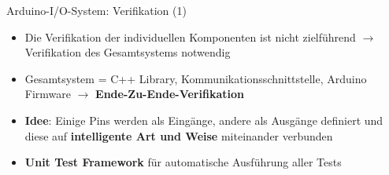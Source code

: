 \documentclass{beamer}
\begin{document}
\begin{frame}{Arduino-I/O-System: Verifikation (1)}
	\begin{itemize}
		\item Die Verifikation der individuellen Komponenten ist nicht zielf\"uhrend $\rightarrow$ Verifikation des Gesamtsystems notwendig
	\end{itemize}
	\begin{itemize}
		\item Gesamtsystem = C++ Library, Kommunikationsschnittstelle, Arduino Firmware $\rightarrow$ \textbf{Ende-Zu-Ende-Verifikation}
	\end{itemize}
	\begin{itemize}
		\item \textbf{Idee}: Einige Pins werden als Eing\"ange, andere als Ausg\"ange definiert und diese auf \textbf{intelligente Art und Weise} miteinander verbunden
	\end{itemize}
	\begin{itemize}
		\item \textbf{Unit Test Framework} f\"ur automatische Ausf\"uhrung aller Tests
	\end{itemize}
\end{frame}
\end{document}
